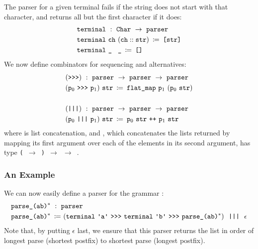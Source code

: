       The parser for a given terminal fails if the string does not start with that character, and returns all but the first character if it does:
\begin{align*}
&\fname{terminal}~:~\indname{Char}~\to~\fname{parser}\\
&\fname{terminal}~\farg{ch}~(\cons{\farg{ch}}{\farg{str}}) \functiondefeq \valuelist{\farg{str}} \\
&\fname{terminal}~\aswidthof{\termhole}{\farg{ch}}~\termhole \functiondefeq \nil
\end{align*}
      We now define combinators for sequencing and alternatives:
\newcommand{\sequencing}{\fname{>{}>{}>}}
\begin{align*}
&(\sequencing)~:~\fname{parser}~\to~\fname{parser}~\to~\fname{parser}\\
&(\farg{p\ensuremath{_0}}~\sequencing~\farg{p\ensuremath{_1}})~\farg{str} \functiondefeq \fname{flat\_map}~\farg{p\ensuremath{_1}}~(\farg{p\ensuremath{_0}}~\farg{str}) \\ \\
&(\fname{|||})~:~\fname{parser}~\to~\fname{parser}~\to~\fname{parser}\\
&(\farg{p\ensuremath{_0}}~\fname{|||}~\farg{p\ensuremath{_1}})~\farg{str} \functiondefeq \farg{p\ensuremath{_0}}~\farg{str}~\fname{++}~\farg{p\ensuremath{_1}}~\farg{str}
\end{align*}
      where \fname{++} is list concatenation, and , which concatenates the lists returned by mapping its first argument over each of the elements in its second argument, has type \texttt{( $\to$ ) $\to$  $\to$ }.
      
    \subsubsection{An Example}
    
      We can now easily define a parser for the grammar :
\begin{align*}
&\fname{parse\_\regex{(ab)\ensuremath{^*}}}~:~\fname{parser} \\
&\fname{parse\_\regex{(ab)\ensuremath{^*}}} \functiondefeq (\fname{terminal}~\terminal{a}~\sequencing~\fname{terminal}~\terminal{b}~\sequencing~\fname{parse\_\regex{(ab)\ensuremath{^*}}})~~\fname{|||}~~\epsilon
\end{align*}
      Note that, by putting $\epsilon$ last, we ensure that this parser returns the list in order of longest parse (shortest postfix) to shortest parse (longest postfix).
      
